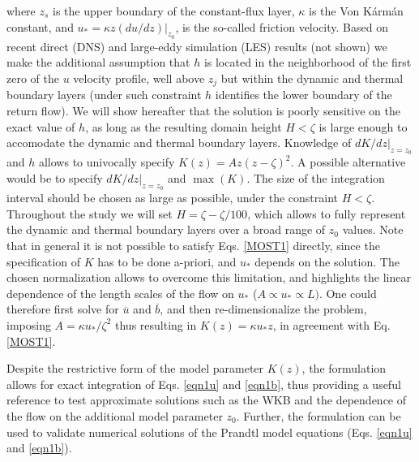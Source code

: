 %
where $z_s$ is the upper boundary of the constant-flux layer, $\kappa$ is the Von K\'arm\'an constant, and $u_* = \kappa z (du/dz)|_{z_0}$, is the so-called friction velocity.
Based on recent direct (DNS) and large-eddy simulation (LES) results (not shown) we make the additional assumption that $h$ is located in the neighborhood of the first zero of the $u$ velocity profile, well above $z_j$ but within the dynamic and thermal boundary layers (under such constraint $h$ identifies the lower boundary of the return flow). 
We will show hereafter that the solution is poorly sensitive on the exact value of $h$, as long as the resulting domain height $H<\zeta$ is large enough to accomodate the dynamic and thermal boundary layers.
Knowledge of $dK/dz|_{z=z_0}$ and $h$ allows to univocally specify $K(z)= Az(z-\zeta)^2$. A possible alternative would be to specify $dK/dz|_{z=z_0}$ and $\max{(K)}$. 
The size of the integration interval should be chosen as large as possible, under the constraint $H<\zeta$. Throughout the study we will set $H = \zeta-\zeta/100$, which allows to fully represent the dynamic and thermal boundary layers over a broad range of $z_0$ values.
Note that in general it is not possible to satisfy Eqs. \ref{MOST1} directly, since the specification of $K$ has to be done a-priori, and $u_*$ depends on the solution. 
The chosen normalization allows to overcome this limitation, and highlights the linear dependence of the length scales of the flow on $u_*$ ($A \propto u_* \propto L)$.
One could therefore first solve for $\overline{u}$ and $\overline{b}$, and then re-dimensionalize the problem, imposing $A=\kappa u_* / \zeta^2$ thus resulting in $K(z)=\kappa u_* z$, in agreement with Eq. \ref{MOST1}.

Despite the restrictive form of the model parameter $K(z)$, the formulation allows for exact integration of Eqs. \ref{eqn1u} and \ref{eqn1b}, thus providing a useful reference to test approximate solutions such as the WKB \citep{grisogono2001katabatic} and the dependence of the flow on the additional model parameter $z_0$. Further, the formulation can be used to validate numerical solutions of the Prandtl model equations (Eqs. \ref{eqn1u} and \ref{eqn1b}).


